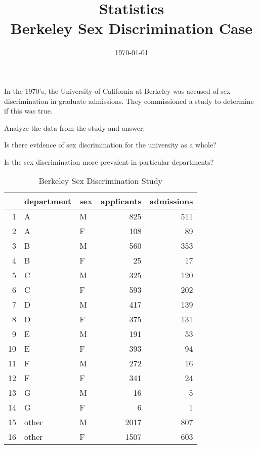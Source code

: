 \documentclass[letterpaper, landscape]{exam}
\title{Statistics \\ Berkeley Sex Discrimination Case}
\date{\today}
\author{}
\begin{document}
\maketitle

  In the 1970's, the University of California at Berkeley was accused of sex
  discrimination in graduate admissions.  They commissioned a study to determine if
  this was true.

  Analyze the data from the study and answer:
  \begin{itemize*}
    \item Is there evidence of sex discrimination for the university as a whole?
    \item Is the sex discrimination more prevalent in particular departments?
  \end{itemize*}

  \begin{table}[H]
    \centering
    \begin{tabular}{rllrr}
      \toprule
         & department & sex & applicants & admissions \\
      \midrule
      1  & A          & M   & 825        & 511 \\
      2  & A          & F   & 108        & 89 \\
      \midrule
      3  & B          & M   & 560        & 353 \\
      4  & B          & F   & 25         & 17 \\
      \midrule
      5  & C          & M   & 325        & 120 \\
      6  & C          & F   & 593        & 202 \\
      \midrule
      7  & D          & M   & 417        & 139 \\
      8  & D          & F   & 375        & 131 \\
      \midrule
      9  & E          & M   & 191        & 53 \\
      10 & E          & F   & 393        & 94 \\
      \midrule
      11 & F          & M   & 272        & 16 \\
      12 & F          & F   & 341        & 24 \\
      \midrule
      13 & G          & M   & 16         & 5 \\
      14 & G          & F   & 6          & 1 \\
      \midrule
      15 & other      & M   & 2017       & 807 \\
      16 & other      & F   & 1507       & 603 \\
      \bottomrule
    \end{tabular}
    \caption{Berkeley Sex Discrimination Study}
  \end{table}
\end{document}
